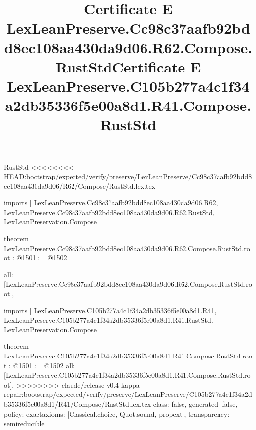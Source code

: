 \begin{lexlean}{RustStd}
<<<<<<<< HEAD:bootstrap/expected/verify/preserve/LexLeanPreserve/Cc98c37aafb92bdd8ec108aa430da9d06/R62/Compose/RustStd.lex.tex
\title{Certificate E LexLeanPreserve.Cc98c37aafb92bdd8ec108aa430da9d06.R62.Compose.RustStd}
\begin{coremodule}
imports [
  LexLeanPreserve.Cc98c37aafb92bdd8ec108aa430da9d06.R62,
  LexLeanPreserve.Cc98c37aafb92bdd8ec108aa430da9d06.R62.RustStd,
  LexLeanPreservation.Compose
]

theorem LexLeanPreserve.Cc98c37aafb92bdd8ec108aa430da9d06.R62.Compose.RustStd.root : @1501 := @1502 {
  all: [LexLeanPreserve.Cc98c37aafb92bdd8ec108aa430da9d06.R62.Compose.RustStd.root],
========
\title{Certificate E LexLeanPreserve.C105b277a4c1f34a2db35336f5e00a8d1.R41.Compose.RustStd}
\begin{coremodule}
imports [
  LexLeanPreserve.C105b277a4c1f34a2db35336f5e00a8d1.R41,
  LexLeanPreserve.C105b277a4c1f34a2db35336f5e00a8d1.R41.RustStd,
  LexLeanPreservation.Compose
]

theorem LexLeanPreserve.C105b277a4c1f34a2db35336f5e00a8d1.R41.Compose.RustStd.root : @1501 := @1502 {
  all: [LexLeanPreserve.C105b277a4c1f34a2db35336f5e00a8d1.R41.Compose.RustStd.root],
>>>>>>>> claude/release-v0.4-kappa-repair:bootstrap/expected/verify/preserve/LexLeanPreserve/C105b277a4c1f34a2db35336f5e00a8d1/R41/Compose/RustStd.lex.tex
  class: false,
  generated: false,
  policy: exact{axioms: [Classical.choice, Quot.sound, propext]},
  transparency: semireducible
}


\end{coremodule}}
\end{coremodule}
\end{lexlean}
